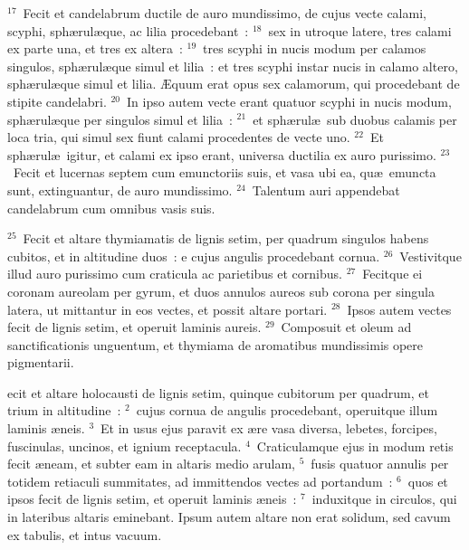 ${}^{17}$~Fecit et candelabrum ductile de auro mundissimo, de cujus vecte calami, scyphi, sph\ae rul\ae que, ac lilia procedebant~:
${}^{18}$~sex in utroque latere, tres calami ex parte una, et tres ex altera~:
${}^{19}$~tres scyphi in nucis modum per calamos singulos, sph\ae rul\ae que simul et lilia~: et tres scyphi instar nucis in calamo altero, sph\ae rul\ae que simul et lilia. \AE quum erat opus sex calamorum, qui procedebant de stipite candelabri.
${}^{20}$~In ipso autem vecte erant quatuor scyphi in nucis modum, sph\ae rul\ae que per singulos simul et lilia~:
${}^{21}$~et sph\ae rul\ae\ sub duobus calamis per loca tria, qui simul sex fiunt calami procedentes de vecte uno.
${}^{22}$~Et sph\ae rul\ae\ igitur, et calami ex ipso erant, universa ductilia ex auro purissimo.
${}^{23}$~Fecit et lucernas septem cum emunctoriis suis, et vasa ubi ea, qu\ae\ emuncta sunt, extinguantur, de auro mundissimo.
${}^{24}$~Talentum auri appendebat candelabrum cum omnibus vasis suis.


${}^{25}$~Fecit et altare thymiamatis de lignis setim, per quadrum singulos habens cubitos, et in altitudine duos~: e cujus angulis procedebant cornua.
${}^{26}$~Vestivitque illud auro purissimo cum craticula ac parietibus et cornibus.
${}^{27}$~Fecitque ei coronam aureolam per gyrum, et duos annulos aureos sub corona per singula latera, ut mittantur in eos vectes, et possit altare portari.
${}^{28}$~Ipsos autem vectes fecit de lignis setim, et operuit laminis aureis.
${}^{29}$~Composuit et oleum ad sanctificationis unguentum, et thymiama de aromatibus mundissimis opere pigmentarii.

\bchapter
{}ecit et altare holocausti de lignis setim, quinque cubitorum per quadrum, et trium in altitudine~:
${}^{2}$~cujus cornua de angulis procedebant, operuitque illum laminis \ae neis.
${}^{3}$~Et in usus ejus paravit ex \ae re vasa diversa, lebetes, forcipes, fuscinulas, uncinos, et ignium receptacula.
${}^{4}$~Craticulamque ejus in modum retis fecit \ae neam, et subter eam in altaris medio arulam,
${}^{5}$~fusis quatuor annulis per totidem retiaculi summitates, ad immittendos vectes ad portandum~:
${}^{6}$~quos et ipsos fecit de lignis setim, et operuit laminis \ae neis~:
${}^{7}$~induxitque in circulos, qui in lateribus altaris eminebant. Ipsum autem altare non erat solidum, sed cavum ex tabulis, et intus vacuum.


